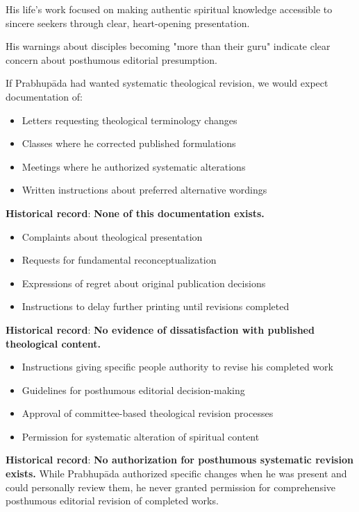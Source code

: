 \documentclass[12pt,twoside]{book}
\begin{document}
His life's work focused on making authentic spiritual knowledge accessible to sincere seekers through clear, heart-opening presentation.

His warnings about disciples becoming "more than their guru" indicate clear concern about posthumous editorial presumption.


If Prabhupāda had wanted systematic theological revision, we would expect documentation of:

\begin{itemize}
\item Letters requesting theological terminology changes
\item Classes where he corrected published formulations
\item Meetings where he authorized systematic alterations
\item Written instructions about preferred alternative wordings
\end{itemize}

\textbf{\textbf{Historical record}}: \textbf{\textbf{None of this documentation exists.}}

\begin{itemize}
\item Complaints about theological presentation
\item Requests for fundamental reconceptualization
\item Expressions of regret about original publication decisions
\item Instructions to delay further printing until revisions completed
\end{itemize}

\textbf{\textbf{Historical record}}: \textbf{\textbf{No evidence of dissatisfaction with published theological content.}}

\begin{itemize}
\item Instructions giving specific people authority to revise his completed work
\item Guidelines for posthumous editorial decision-making
\item Approval of committee-based theological revision processes
\item Permission for systematic alteration of spiritual content
\end{itemize}

\textbf{\textbf{Historical record}}: \textbf{\textbf{No authorization for posthumous systematic revision exists.}} While Prabhupāda authorized specific changes when he was present and could personally review them, he never granted permission for comprehensive posthumous editorial revision of completed works.
\end{document}

